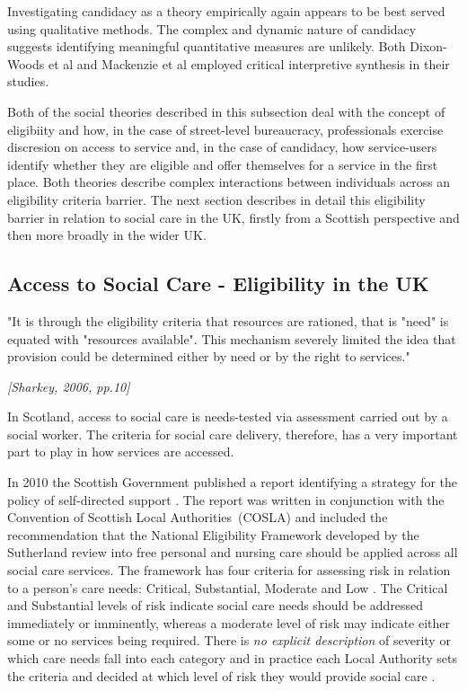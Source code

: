 \documentclass[12pt,]{report}
\begin{document}
Investigating candidacy as a theory empirically again appears to be best
served using qualitative methods. The complex and dynamic nature of
candidacy suggests identifying meaningful quantitative measures are
unlikely. Both Dixon-Woods et al
\citetext{\citeyear{RN438}; \citeyear{RN437}} and Mackenzie et al
\citetext{\citeyear{RN84}; \citeyear{RN434}} employed critical
interpretive synthesis in their studies.

Both of the social theories described in this subsection deal with the
concept of eligibiity and how, in the case of street-level bureaucracy,
professionals exercise discresion on access to service and, in the case
of candidacy, how service-users identify whether they are eligible and
offer themselves for a service in the first place. Both theories
describe complex interactions between individuals across an eligibility
criteria barrier. The next section describes in detail this eligibility
barrier in relation to social care in the UK, firstly from a Scottish
perspective and then more broadly in the wider UK.

\subsection{Access to Social Care - Eligibility in the UK}\label{subsubsec:eligibility-uk}

\epigraph{"It is through the eligibility criteria that resources are rationed, that is "need" is equated with "resources available". This mechanism severely limited the idea that provision could be determined either by need or by the right to services."}{\textit{[Sharkey, 2006, pp.10]}}

In Scotland, access to social care is needs-tested via assessment
carried out by a social worker. The criteria for social care delivery,
therefore, has a very important part to play in how services are
accessed.

In 2010 the Scottish Government published a report identifying a
strategy for the policy of self-directed support \citep{RN171}. The
report was written in conjunction with the Convention of Scottish Local
Authorities~(COSLA) and included the recommendation that the National
Eligibility Framework developed by the Sutherland review into free
personal and nursing care \citeyearpar{RN172} should be applied across
all social care services. The framework has four criteria for assessing
risk in relation to a person's care needs: Critical, Substantial,
Moderate and Low \citep{RN184}. The Critical and Substantial levels of
risk indicate social care needs should be addressed immediately or
imminently, whereas a moderate level of risk may indicate either some or
no services being required. There is \emph{no explicit description} of
severity or which care needs fall into each category and in practice
each Local Authority sets the criteria and decided at which level of
risk they would provide social care \citep{RN170}.
\end{document}
